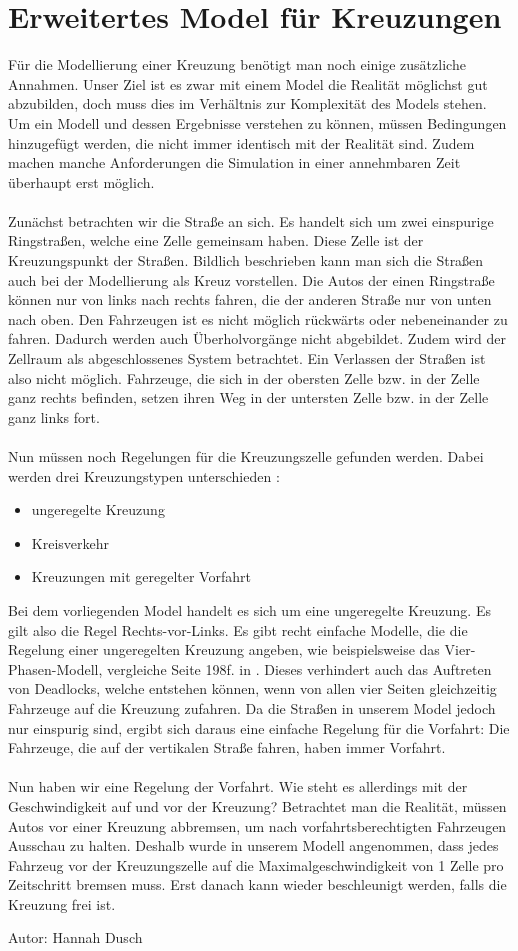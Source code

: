 \section{Erweitertes Model für Kreuzungen} \label{sec:erwmodel}
Für die Modellierung einer Kreuzung benötigt man noch einige zusätzliche Annahmen. Unser Ziel ist es zwar mit einem Model die Realität möglichst gut abzubilden, doch muss dies im Verhältnis zur Komplexität des Models stehen. Um ein Modell und dessen Ergebnisse verstehen zu können, müssen Bedingungen hinzugefügt werden, die nicht immer identisch mit der Realität sind. Zudem machen manche Anforderungen die Simulation in einer annehmbaren Zeit überhaupt erst möglich. 
\\ \\
Zunächst betrachten wir die Straße an sich. Es handelt sich um zwei einspurige Ringstraßen, welche eine Zelle gemeinsam haben. Diese Zelle ist der Kreuzungspunkt der Straßen. Bildlich beschrieben kann man sich die Straßen auch bei der Modellierung als Kreuz vorstellen. Die Autos der einen Ringstraße können nur von links nach rechts fahren, die der anderen Straße nur von unten nach oben. Den Fahrzeugen ist es nicht möglich rückwärts oder nebeneinander zu fahren. Dadurch werden auch Überholvorgänge nicht abgebildet. Zudem wird der Zellraum als abgeschlossenes System betrachtet. Ein Verlassen der Straßen ist also nicht möglich. Fahrzeuge, die sich in der obersten Zelle bzw. in der Zelle ganz rechts befinden, setzen ihren Weg in der untersten Zelle bzw. in der Zelle ganz links fort. 
\\ \\
Nun müssen noch Regelungen für die Kreuzungszelle gefunden werden. Dabei werden drei Kreuzungstypen unterschieden \cite{book:bungartz}:
\begin{itemize}
	\item ungeregelte Kreuzung
      \item Kreisverkehr
      \item Kreuzungen mit geregelter Vorfahrt
\end{itemize}
Bei dem vorliegenden Model handelt es sich um eine ungeregelte Kreuzung. Es gilt also die Regel \glqq Rechts-vor-Links\grqq. Es gibt recht einfache Modelle, die die Regelung einer ungeregelten Kreuzung angeben, wie beispielsweise das Vier-Phasen-Modell, vergleiche Seite 198f. in \cite{book:bungartz}. Dieses verhindert auch das Auftreten von Deadlocks, welche entstehen können, wenn von allen vier Seiten gleichzeitig Fahrzeuge auf die Kreuzung zufahren. Da die Straßen in unserem Model jedoch nur einspurig sind, ergibt sich daraus eine einfache Regelung für die Vorfahrt: Die Fahrzeuge, die auf der vertikalen Straße fahren, haben immer Vorfahrt. 
\\ \\
Nun haben wir eine Regelung der Vorfahrt. Wie steht es allerdings mit der Geschwindigkeit auf und vor der Kreuzung? Betrachtet man die Realität, müssen Autos vor einer Kreuzung abbremsen, um nach vorfahrtsberechtigten Fahrzeugen Ausschau zu halten. Deshalb wurde in unserem Modell angenommen, dass jedes Fahrzeug vor der Kreuzungszelle auf die Maximalgeschwindigkeit von 1 Zelle pro Zeitschritt bremsen muss. Erst danach kann wieder beschleunigt werden, falls die Kreuzung frei ist. 

\begin{flushright}
Autor: Hannah Dusch
\end{flushright}
